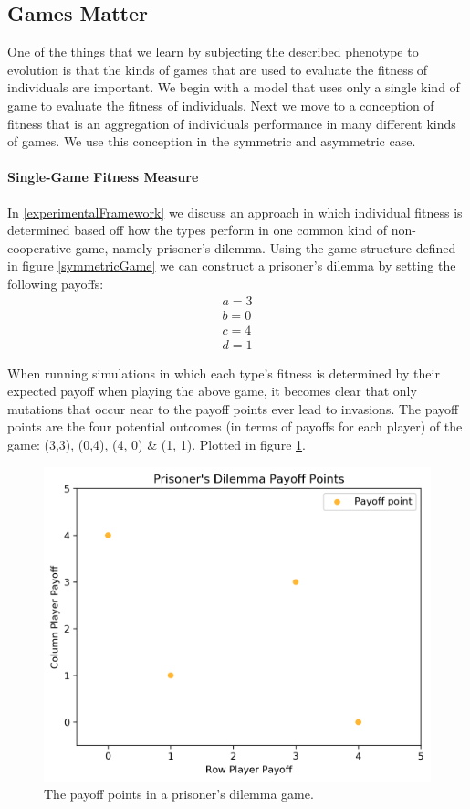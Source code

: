 \documentclass[11pt]{book}
\newcommand*{\np}{\par\noindent\newline}
\begin{document}
\subsection{Games Matter}

One of the things that we learn by subjecting the described phenotype to evolution is that the kinds of games that are used to evaluate the fitness of individuals are important.
We begin with a model that uses only a single kind of game to evaluate the fitness of individuals.
Next we move to a conception of fitness that is an aggregation of individuals performance in many different kinds of games.
We use this conception in the symmetric and asymmetric case.

\paragraph{Single-Game Fitness Measure}
\np In \ref{experimentalFramework} we discuss an approach in which individual fitness is determined based off  how the types perform in one common kind of non-cooperative game, namely prisoner's dilemma.
Using the game structure defined in figure \ref{symmetricGame} we can construct a prisoner's dilemma by setting the following payoffs:
\begin{gather*}
	a = 3\\
	b = 0\\
	c = 4\\
	d = 1
\end{gather*}

\np When running simulations in which each type's fitness is determined by their expected payoff when playing the above game,
it becomes clear that only mutations that occur near to the payoff points ever lead to invasions. 
The payoff points are the four potential outcomes (in terms of payoffs for each player) of the game: (3,3), (0,4), (4, 0) \& (1, 1).
Plotted in figure \ref{prisoners_payoff_plot}.
\begin{figure}
	\centering
	\includegraphics[scale=0.5]{resources/prisoners_dilemma_payoffs.png}
	\caption{The payoff points in a prisoner's dilemma game.}
	\label{prisoners_payoff_plot}
\end{figure}
\end{document}
